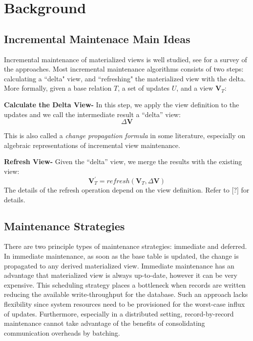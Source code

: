 \section{Background}\label{sec-background}

\subsection{Incremental Maintenace Main Ideas}
Incremental maintenance of materialized views is well studied, see \cite{chirkova2011materialized} for a survey of the approaches. 
Most incremental maintenance algorithms consists of two steps: calculating a ``delta" view,
and ``refreshing" the materialized view with the delta.
More formally, given a base relation $T$, a set of updates $U$,
and a view $\textbf{V}_{T}$:

\textbf{Calculate the Delta View- }
In this step, we apply the view definition to the updates and we call
the intermediate result a ``delta'' view:
\[
\Delta\textbf{V}
\]

This is also called a \emph{change propagation formula} in some literature,
especially on algebraic representations of incremental view maintenance.

\textbf{Refresh View- }
Given the ``delta'' view, we merge the results with the existing
view:
\[
\textbf{V}_{T}^{'}=refresh(\textbf{V}_{T},\Delta\textbf{V})
\] 
The details of the refresh operation depend on the view definition.
Refer to [?] for details.


\subsection{Maintenance Strategies}
There are two principle types of maintenance strategies: immediate and deferred. 
In immediate maintenance, as soon as the base table is updated, 
the change is propagated to any derived materialized view.
Immediate maintenance has an advantage that materialized view is always up-to-date, 
however it can be very expensive.
This scheduling strategy places a bottleneck when records are written reducing 
the available write-throughput for the database.
Such an approach lacks flexibility since system resources need to be provisioned 
for the worst-case influx of updates.
Furthermore, especially in a distributed setting, record-by-record 
maintenance cannot take advantage of the benefits of consolidating communication overheads by batching.

